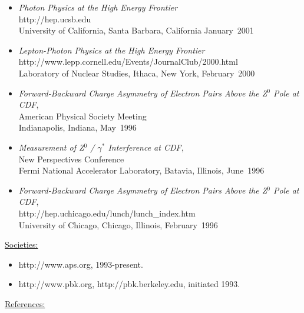\documentclass [12pt]{report}
\begin{document}
\begin{itemize}
{Les Arcs, France, March~2001}
\item{{\em Photon Physics at the High Energy Frontier}\\ 
{http://hep.ucsb.edu}\\
University of California, Santa Barbara, California January~2001}
\item{{\em Lepton-Photon Physics at the High Energy Frontier}\\ 
{http://www.lepp.cornell.edu/Events/JournalClub/2000.html}\\
Laboratory of Nuclear Studies, Ithaca, New York, February~2000}
\item{{\em Forward-Backward Charge Asymmetry of Electron Pairs Above the 
Z$^0$ Pole at CDF},\\ 
American Physical Society Meeting\\
Indianapolis, Indiana, May~1996}
\item{{\em Measurement of Z$^0$ / $\gamma^{*}$ Interference at CDF},\\ 
New Perspectives Conference\\
Fermi National Accelerator Laboratory, Batavia, Illinois, June~1996}
\item{{\em Forward-Backward Charge Asymmetry of Electron Pairs Above the 
Z$^0$ Pole at CDF},\\ 
{http://hep.uchicago.edu/lunch/lunch_index.htm}\\
University of Chicago, Chicago, Illinois, February~1996}
\end{itemize}


\noindent\underline{Societies:}
\begin{itemize}
\item {
{http://www.aps.org}, 1993-present.}
\item {
{http://www.pbk.org}, 
{http://pbk.berkeley.edu}, initiated 1993. }
\end{itemize}
\clearpage 
\newpage 

\noindent\underline{References:}
\end{document}
